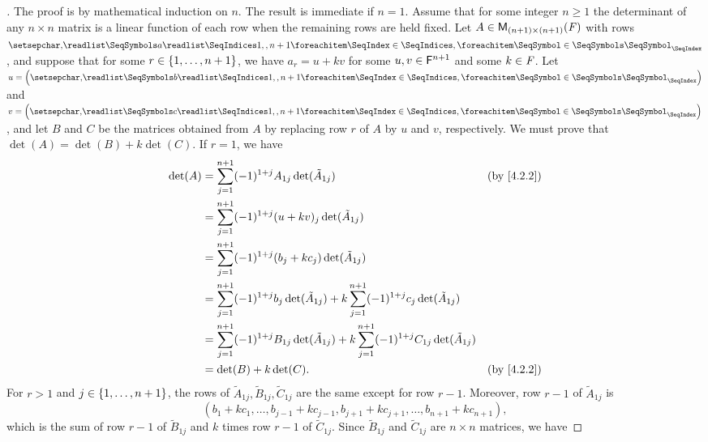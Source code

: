 \begin{proof}[]
	The proof is by mathematical induction on \(n\).
	The result is immediate if \(n = 1\).
	Assume that for some integer \(n \geq 1\) the determinant of any \(n \times n\) matrix is a linear function of each row when the remaining rows are held fixed.
	Let \(A \in \mathsf{M}_{{(n + 1)} \times (n + 1)}({\mathit{F}})\) with rows \(\seq{a}{1,,n+1}\), and suppose that for some \(r \in \left\lbrace1, \dots, n + 1\right\rbrace\), we have \(a_r = u + kv\) for some \(u, v \in \mathsf{F}^{n + 1}\) and some \(k \in \mathit{F}\).
	Let \(u = \tuple{b}{1,,n+1}\) and \(v = \tuple{c}{1,,n+1}\), and let \(B\) and \(C\) be the matrices obtained from \(A\) by replacing row \(r\) of \(A\) by \(u\) and \(v\), respectively.
	We must prove that \(\det(A) = \det(B) + k \det(C)\).
	If \(r = 1\), we have
	\begin{align*}
		\det(A) & = \sum_{j = 1}^{n + 1} (-1)^{1 + j} A_{1 j} \det(\tilde{A}_{1 j})                                                                     &  & \by{4.2.2} \\
		        & = \sum_{j = 1}^{n + 1} (-1)^{1 + j} (u + kv)_j \det(\tilde{A}_{1 j})                                                                                  \\
		        & = \sum_{j = 1}^{n + 1} (-1)^{1 + j} (b_j + k c_j) \det(\tilde{A}_{1 j})                                                                               \\
		        & = \sum_{j = 1}^{n + 1} (-1)^{1 + j} b_j \det(\tilde{A}_{1 j}) + k \sum_{j = 1}^{n + 1} (-1)^{1 + j} c_j \det(\tilde{A}_{1 j})                         \\
		        & = \sum_{j = 1}^{n + 1} (-1)^{1 + j} B_{1 j} \det(\tilde{A}_{1 j}) + k \sum_{j = 1}^{n + 1} (-1)^{1 + j} C_{1 j} \det(\tilde{A}_{1 j})                 \\
		        & = \det(B) + k \det(C).                                                                                                                &  & \by{4.2.2}
	\end{align*}
	For \(r > 1\) and \(j \in \left\lbrace1, \dots, n + 1\right\rbrace\), the rows of \(\tilde{A}_{1 j}, \tilde{B}_{1 j}, \tilde{C}_{1 j}\) are the same except for row \(r - 1\).
	Moreover, row \(r - 1\) of \(\tilde{A}_{1 j}\) is
	\[
		(b_1 + k c_1, \dots, b_{j - 1} + k c_{j - 1}, b_{j + 1} + k c_{j + 1}, \dots, b_{n + 1} + k c_{n + 1}),
	\]
	which is the sum of row \(r - 1\) of \(\tilde{B}_{1 j}\) and \(k\) times row \(r - 1\) of \(\tilde{C}_{1 j}\).
	Since \(\tilde{B}_{1 j}\) and \(\tilde{C}_{1 j}\) are \(n \times n\) matrices, we have

\end{proof}
